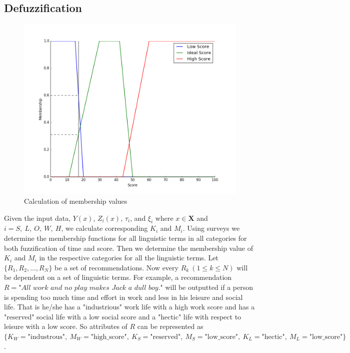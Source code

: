 \documentclass[conference]{IEEEtran}
\begin{document}
\subsection{Defuzzification}
\begin{figure}[h!]
\centering
\captionsetup{justification=centering}
\noindent \includegraphics[scale=0.35]{health_score}
\caption{Calculation of membership values}
\end{figure}
Given the input data, $Y(x)$, $Z_i(x)$, $\tau_i$, and $\xi_i$ where $x \in \mathbf{X}$ and $i = S,\ L,\ O,\ W,\ H$, we calculate corresponding $K_i$ and $M_i$. Using surveys we determine the membership functions for all linguistic terms in all categories for both fuzzification of time and score. Then we determine the membership value of $K_i$ and $M_i$ in the respective categories for all the linguistic terms. Let $\{R_1, R_2, \ldots, R_N\}$ be a set of recommendations. Now every $R_k\ (1 \leq k \leq N)$ will be dependent on a set of linguistic terms. For example, a recommendation $R = \textit{"All work and no play makes Jack a dull boy."}$ will be outputted if a person is spending too much time and effort in work and less in his leisure and social life. That is he/she has a "industrious" work life with a high work score and has a "reserved" social life with a low social score and a "hectic" life with respect to leisure with a low score. So attributes of $R$ can be represented as $\{K_W=\text{"industrous"},\ M_W=\text{"high\_score"},\ K_S=\text{"reserved"},\ M_S=\text{"low\_score"},\ K_L=\text{"hectic"},\ M_L=\text{"low\_score"}\}$.
\end{document}
